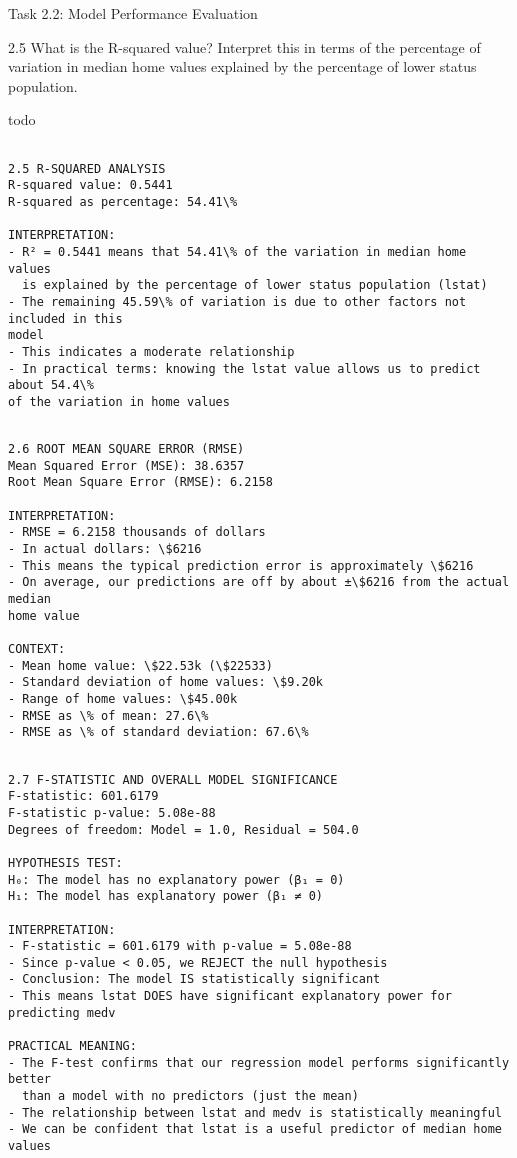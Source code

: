 \documentclass[11pt, twocolumn]{article}
\begin{document}
    Task 2.2: Model Performance Evaluation

    2.5 What is the R-squared value? Interpret this in terms of the
percentage of variation in median home values explained by the
percentage of lower status population.

todo

    \begin{Verbatim}[commandchars=\\\{\}]

2.5 R-SQUARED ANALYSIS
R-squared value: 0.5441
R-squared as percentage: 54.41\%

INTERPRETATION:
- R² = 0.5441 means that 54.41\% of the variation in median home values
  is explained by the percentage of lower status population (lstat)
- The remaining 45.59\% of variation is due to other factors not included in this
model
- This indicates a moderate relationship
- In practical terms: knowing the lstat value allows us to predict about 54.4\%
of the variation in home values
    \end{Verbatim}

    \begin{Verbatim}[commandchars=\\\{\}]

2.6 ROOT MEAN SQUARE ERROR (RMSE)
Mean Squared Error (MSE): 38.6357
Root Mean Square Error (RMSE): 6.2158

INTERPRETATION:
- RMSE = 6.2158 thousands of dollars
- In actual dollars: \$6216
- This means the typical prediction error is approximately \$6216
- On average, our predictions are off by about ±\$6216 from the actual median
home value

CONTEXT:
- Mean home value: \$22.53k (\$22533)
- Standard deviation of home values: \$9.20k
- Range of home values: \$45.00k
- RMSE as \% of mean: 27.6\%
- RMSE as \% of standard deviation: 67.6\%
    \end{Verbatim}

    \begin{Verbatim}[commandchars=\\\{\}]

2.7 F-STATISTIC AND OVERALL MODEL SIGNIFICANCE
F-statistic: 601.6179
F-statistic p-value: 5.08e-88
Degrees of freedom: Model = 1.0, Residual = 504.0

HYPOTHESIS TEST:
H₀: The model has no explanatory power (β₁ = 0)
H₁: The model has explanatory power (β₁ ≠ 0)

INTERPRETATION:
- F-statistic = 601.6179 with p-value = 5.08e-88
- Since p-value < 0.05, we REJECT the null hypothesis
- Conclusion: The model IS statistically significant
- This means lstat DOES have significant explanatory power for predicting medv

PRACTICAL MEANING:
- The F-test confirms that our regression model performs significantly better
  than a model with no predictors (just the mean)
- The relationship between lstat and medv is statistically meaningful
- We can be confident that lstat is a useful predictor of median home values
    \end{Verbatim}
\end{document}
